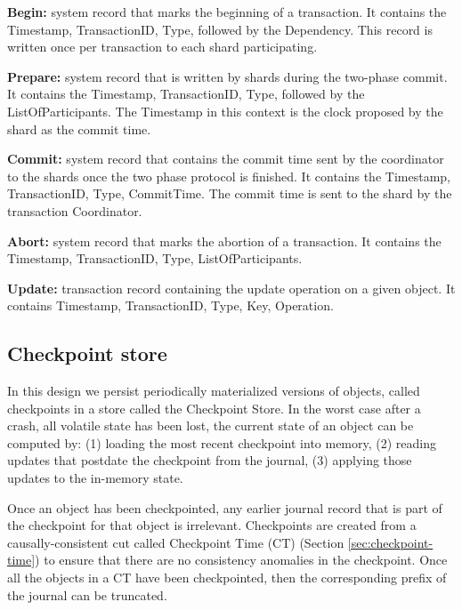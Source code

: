 \documentclass[11pt]{article}
\begin{document}
\begin{compactitem}
\item \textbf{Begin:} system record that marks the beginning of a
transaction. 
It contains the Timestamp, TransactionID, Type, followed by the Dependency.
This record is written once per transaction to each shard
participating.
\item \textbf{Prepare:} system record that is written by shards during the two-phase commit. 
It contains the Timestamp, TransactionID, Type, followed by the ListOfParticipants.
The Timestamp in this context is the clock proposed by the shard as the commit time.
\item \textbf{Commit:} system record that contains the commit time sent by the coordinator
to the shards once the two phase protocol is finished.
It contains the Timestamp, TransactionID, Type, CommitTime.
The commit time is sent to the shard by the transaction Coordinator.
\item \textbf{Abort:} system record that marks the abortion of a transaction.
It contains the Timestamp, TransactionID, Type, ListOfParticipants.
\item \textbf{Update:} transaction record containing the update operation on a given
object.
It contains Timestamp, TransactionID, Type, Key, Operation.
\end{compactitem}


\subsection{Checkpoint store}
\label{sec:checkpoint-store}

In this design we persist periodically materialized versions of objects, called
checkpoints in a store called the Checkpoint Store.  
In the worst case after a crash, all volatile state has been lost, the current
state of an object can be computed by: (1) loading the most recent checkpoint
into memory, (2) reading updates that postdate the checkpoint from the journal,
(3) applying those updates to the in-memory state.

Once an object has been checkpointed, any earlier journal record that is part of 
the checkpoint for that object is irrelevant. 
Checkpoints are created from a causally-consistent cut called Checkpoint Time
(CT) (Section \ref{sec:checkpoint-time}) to ensure that there are no consistency
anomalies in the checkpoint.
Once all the objects in a CT have been checkpointed, then the corresponding
prefix of the journal can be truncated. 
\end{document}
